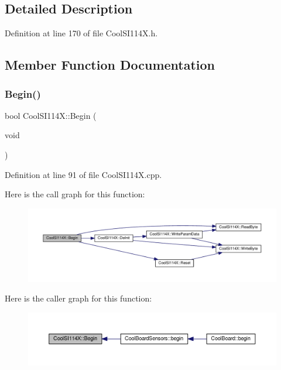 \subsection{Detailed Description}


Definition at line 170 of file Cool\+S\+I114\+X.\+h.



\subsection{Member Function Documentation}
\mbox{\label{class_cool_s_i114_x_a206b36aca7049f63be1d11088c30a09f}} 
\subsubsection{\texorpdfstring{Begin()}{Begin()}}
{\footnotesize\ttfamily bool Cool\+S\+I114\+X\+::\+Begin (\begin{DoxyParamCaption}\item[{void}]{ }\end{DoxyParamCaption})}



Definition at line 91 of file Cool\+S\+I114\+X.\+cpp.

Here is the call graph for this function\+:\nopagebreak
\begin{figure}[H]
\begin{center}
\leavevmode
\includegraphics[width=350pt]{class_cool_s_i114_x_a206b36aca7049f63be1d11088c30a09f_cgraph}
\end{center}
\end{figure}
Here is the caller graph for this function\+:\nopagebreak
\begin{figure}[H]
\begin{center}
\leavevmode
\includegraphics[width=350pt]{class_cool_s_i114_x_a206b36aca7049f63be1d11088c30a09f_icgraph}
\end{center}
\end{figure}
\mbox{\label{class_cool_s_i114_x_a6840abd53a2e3d71a6bb918077c6d6e6}} 
